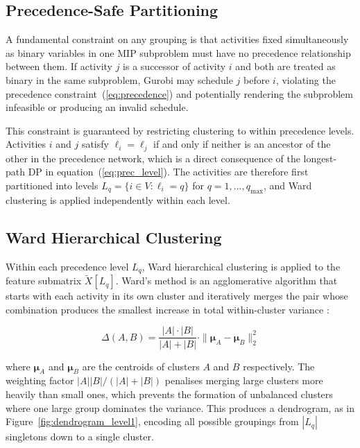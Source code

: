 \subsection{Precedence-Safe Partitioning}
\label{subsec:prec_safety}
A fundamental constraint on any grouping is that activities fixed
simultaneously as binary variables in one MIP subproblem must have
no precedence relationship between them. If activity $j$ is a
successor of activity $i$ and both are treated as binary in the
same subproblem, Gurobi may schedule $j$ before $i$, violating
the precedence constraint~(\ref{eq:precedence}) and potentially
rendering the subproblem infeasible or producing an invalid
schedule.

This constraint is guaranteed by restricting clustering to within
precedence levels. Activities $i$ and $j$ satisfy $\ell_i =
\ell_j$ if and only if neither is an ancestor of the other in
the precedence network, which is a direct consequence of the longest-path
DP in equation~(\ref{eq:prec_level}). The activities are therefore
first partitioned into levels $L_q = \{i \in V : \ell_i = q\}$
for $q = 1, \ldots, q_{\max}$, and Ward clustering is applied
independently within each level.

\subsection{Ward Hierarchical Clustering}
\label{subsec:ward}
Within each precedence level $L_q$, Ward hierarchical clustering
\parencite{Ward1963} is applied to the feature submatrix
$\tilde{X}[L_q]$. Ward's method is an agglomerative algorithm
that starts with each activity in its own cluster and
iteratively merges the pair whose combination produces the
smallest increase in total within-cluster variance
\parencite{Murtagh2012}:

\begin{equation}
    \Delta(A, B) = \frac{|A| \cdot |B|}{|A| + |B|}
    \cdot \|\boldsymbol{\mu}_A - \boldsymbol{\mu}_B\|_2^2
    \label{eq:ward}
\end{equation}

where $\boldsymbol{\mu}_A$ and $\boldsymbol{\mu}_B$ are the
centroids of clusters $A$ and $B$ respectively. The weighting
factor $|A||B|/(|A|+|B|)$ penalises merging large clusters more
heavily than small ones, which prevents the formation of
unbalanced clusters where one large group dominates the variance.
This produces a dendrogram, as in Figure~\ref{fig:dendrogram_level1}, encoding all possible groupings from
$|L_q|$ singletons down to a single cluster.

